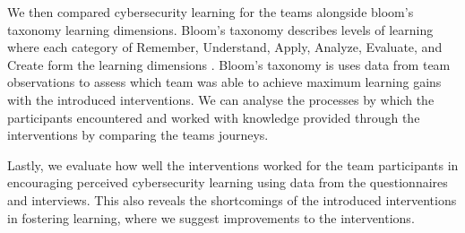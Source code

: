 \documentclass[runningheads]{llncs}
\begin{document}
We then compared cybersecurity learning for the teams alongside bloom's taxonomy learning dimensions.
Bloom's taxonomy describes levels of learning where each category of Remember, Understand, Apply, Analyze, Evaluate, and Create form the learning dimensions \cite{bloom1956taxonomy,krathwohl2009taxonomy}.
Bloom's taxonomy is uses data from team observations to assess which team was able to achieve maximum learning gains with the introduced interventions. We can analyse the processes by which the participants encountered and worked with knowledge provided through the interventions by comparing the teams journeys.


Lastly, we evaluate how well the interventions worked for the team participants in encouraging perceived cybersecurity learning using data from the questionnaires and interviews. This also reveals the shortcomings of the introduced interventions in fostering learning, where we suggest improvements to the interventions.
\end{document}

